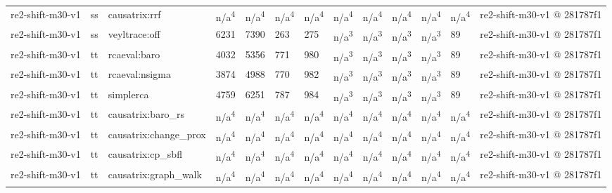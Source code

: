 \begin{table}[t]
\begin{tabular}{lllllllllllll}
re2-shift-m30-v1 & ss & causatrix:rrf & n/a\textsuperscript{4} & n/a\textsuperscript{4} & n/a\textsuperscript{4} & n/a\textsuperscript{4} & n/a\textsuperscript{4} & n/a\textsuperscript{4} & n/a\textsuperscript{4} & n/a\textsuperscript{4} & n/a\textsuperscript{4} & re2-shift-m30-v1 @ 281787f1 \\
re2-shift-m30-v1 & ss & veyltrace:off & 6231 & 7390 & 263 & 275 & n/a\textsuperscript{3} & n/a\textsuperscript{3} & n/a\textsuperscript{3} & n/a\textsuperscript{3} & 89 & re2-shift-m30-v1 @ 281787f1 \\
re2-shift-m30-v1 & tt & rcaeval:baro & 4032 & 5356 & 771 & 980 & n/a\textsuperscript{3} & n/a\textsuperscript{3} & n/a\textsuperscript{3} & n/a\textsuperscript{3} & 89 & re2-shift-m30-v1 @ 281787f1 \\
re2-shift-m30-v1 & tt & rcaeval:nsigma & 3874 & 4988 & 770 & 982 & n/a\textsuperscript{3} & n/a\textsuperscript{3} & n/a\textsuperscript{3} & n/a\textsuperscript{3} & 89 & re2-shift-m30-v1 @ 281787f1 \\
re2-shift-m30-v1 & tt & simplerca & 4759 & 6251 & 787 & 984 & n/a\textsuperscript{3} & n/a\textsuperscript{3} & n/a\textsuperscript{3} & n/a\textsuperscript{3} & 89 & re2-shift-m30-v1 @ 281787f1 \\
re2-shift-m30-v1 & tt & causatrix:baro\_rs & n/a\textsuperscript{4} & n/a\textsuperscript{4} & n/a\textsuperscript{4} & n/a\textsuperscript{4} & n/a\textsuperscript{4} & n/a\textsuperscript{4} & n/a\textsuperscript{4} & n/a\textsuperscript{4} & n/a\textsuperscript{4} & re2-shift-m30-v1 @ 281787f1 \\
re2-shift-m30-v1 & tt & causatrix:change\_prox & n/a\textsuperscript{4} & n/a\textsuperscript{4} & n/a\textsuperscript{4} & n/a\textsuperscript{4} & n/a\textsuperscript{4} & n/a\textsuperscript{4} & n/a\textsuperscript{4} & n/a\textsuperscript{4} & n/a\textsuperscript{4} & re2-shift-m30-v1 @ 281787f1 \\
re2-shift-m30-v1 & tt & causatrix:cp\_sbfl & n/a\textsuperscript{4} & n/a\textsuperscript{4} & n/a\textsuperscript{4} & n/a\textsuperscript{4} & n/a\textsuperscript{4} & n/a\textsuperscript{4} & n/a\textsuperscript{4} & n/a\textsuperscript{4} & n/a\textsuperscript{4} & re2-shift-m30-v1 @ 281787f1 \\
re2-shift-m30-v1 & tt & causatrix:graph\_walk & n/a\textsuperscript{4} & n/a\textsuperscript{4} & n/a\textsuperscript{4} & n/a\textsuperscript{4} & n/a\textsuperscript{4} & n/a\textsuperscript{4} & n/a\textsuperscript{4} & n/a\textsuperscript{4} & n/a\textsuperscript{4} & re2-shift-m30-v1 @ 281787f1 \\

\end{tabular}
\end{table}
